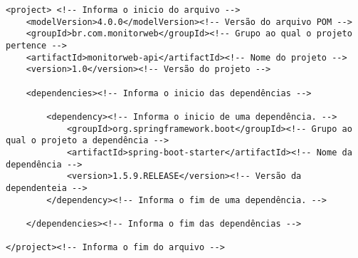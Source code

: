 

\begin{lstlisting}[style=XML,label=Func:ExemploPom,caption={[pom.]pom.}]
<project> <!-- Informa o inicio do arquivo -->
	<modelVersion>4.0.0</modelVersion><!-- Versão do arquivo POM -->
	<groupId>br.com.monitorweb</groupId><!-- Grupo ao qual o projeto pertence -->
	<artifactId>monitorweb-api</artifactId><!-- Nome do projeto -->
	<version>1.0</version><!-- Versão do projeto -->
	
	<dependencies><!-- Informa o inicio das dependências -->
  
		<dependency><!-- Informa o inicio de uma dependência. -->
			<groupId>org.springframework.boot</groupId><!-- Grupo ao qual o projeto a dependência -->
			<artifactId>spring-boot-starter</artifactId><!-- Nome da dependência -->
			<version>1.5.9.RELEASE</version><!-- Versão da dependenteia -->
		</dependency><!-- Informa o fim de uma dependência. -->
	
	</dependencies><!-- Informa o fim das dependências -->
	
</project><!-- Informa o fim do arquivo -->
\end{lstlisting}



